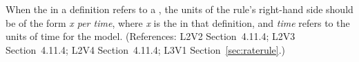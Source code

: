 When the  in a \RateRule definition refers to a \Parameter,
the units of the rule's right-hand side should be of the form \emph{x per
time}, where \emph{x} is the  in that \Parameter definition,
and \emph{time} refers to the units of time for the model.  (References:
L2V2 Section~4.11.4; L2V3 Section~4.11.4; L2V4 Section~4.11.4; L3V1 Section~\ref{sec:raterule}.)
